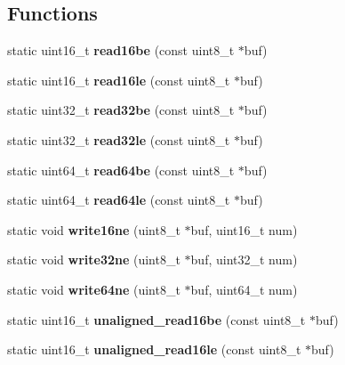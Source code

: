 \subsection*{Functions}
\begin{DoxyCompactItemize}
\item 
static uint16\-\_\-t {\bfseries read16be} (const uint8\-\_\-t $\ast$buf)\label{tuklib__integer_8h_ade5dfb160423314015a92f9d3b41364e}

\item 
static uint16\-\_\-t {\bfseries read16le} (const uint8\-\_\-t $\ast$buf)\label{tuklib__integer_8h_aabdb9935979bb9e6d6b9c43b4ea09219}

\item 
static uint32\-\_\-t {\bfseries read32be} (const uint8\-\_\-t $\ast$buf)\label{tuklib__integer_8h_ad61e457beb44cca201afa4e22a991f7c}

\item 
static uint32\-\_\-t {\bfseries read32le} (const uint8\-\_\-t $\ast$buf)\label{tuklib__integer_8h_a0c1af647880b49c2783a1b8fb5ceb8b3}

\item 
static uint64\-\_\-t {\bfseries read64be} (const uint8\-\_\-t $\ast$buf)\label{tuklib__integer_8h_a6ef94494f1932d82ccd8eec33c84f2ba}

\item 
static uint64\-\_\-t {\bfseries read64le} (const uint8\-\_\-t $\ast$buf)\label{tuklib__integer_8h_a188612f1b09af87b03a4b5f97c236771}

\item 
static void {\bfseries write16ne} (uint8\-\_\-t $\ast$buf, uint16\-\_\-t num)\label{tuklib__integer_8h_a87d1e8e3c3158b34f10644ba14bb4bce}

\item 
static void {\bfseries write32ne} (uint8\-\_\-t $\ast$buf, uint32\-\_\-t num)\label{tuklib__integer_8h_ae1bb649e12f5096e4e17a67027dda451}

\item 
static void {\bfseries write64ne} (uint8\-\_\-t $\ast$buf, uint64\-\_\-t num)\label{tuklib__integer_8h_a018f795a238067705b3ed704625ae816}

\item 
static uint16\-\_\-t {\bfseries unaligned\-\_\-read16be} (const uint8\-\_\-t $\ast$buf)\label{tuklib__integer_8h_a61a37dadae8ea79c9728758acab6f375}

\item 
static uint16\-\_\-t {\bfseries unaligned\-\_\-read16le} (const uint8\-\_\-t $\ast$buf)\label{tuklib__integer_8h_a03f4001c17c5907e160653277953066a}


\end{DoxyCompactItemize}
